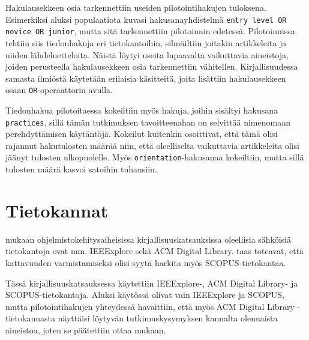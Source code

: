 \documentclass[utf8]{gradu3}
\begin{document}
Hakulausekkeen osia tarkennettiin useiden pilotointihakujen tuloksena. Esimerkiksi aluksi populaatiota kuvasi hakusanayhdistelmä {\tt entry level OR novice OR junior}, mutta sitä tarkennettiin pilotoinnin edetessä. Pilotoinnissa tehtiin siis tiedonhakuja eri tietokantoihin, silmäiltiin joitakin artikkeleita ja niiden lähdeluetteloita. Näistä löytyi useita lupaavalta vaikuttavia aineistoja, joiden perusteella hakulausekkeen osia tarkennettiin vähitellen. Kirjallisuudessa samasta ilmiöstä käytetään erilaisia käsitteitä, joita lisättiin hakulausekkeen osaan {\tt OR}-operaattorin avulla.

Tiedonhakua pilotoitaessa kokeiltiin myös hakuja, joihin sisältyi hakusana {\tt practices}, sillä tämän tutkimuksen tavoitteenahan on selvittää nimenomaan perehdyttämisen käytäntöjä. Kokeilut kuitenkin osoittivat, että tämä olisi rajannut hakutulosten määrää niin, että oleelliselta vaikuttavia artikkeleita olisi jäänyt tulosten ulkopuolelle. Myös {\tt orientation}-hakusanaa kokeiltiin, mutta sillä tulosten määrä kasvoi satoihin tuhansiin.  

\section{Tietokannat}

\textcite{brereton-ym-2007} mukaan ohjelmistokehitysaiheisissa kirjallisuuskatsauksissa oleellisia sähköisiä tietokantoja ovat mm. IEEExplore sekä ACM Digital Library. \textcite{kitchenham-charters-2007} taas toteavat, että kattavuuden varmistamiseksi olisi syytä harkita myös SCOPUS-tietokantaa.

Tässä kirjallisuuskatsauksessa käytettiin IEEExplore-, ACM Digital Library- ja SCOPUS-tietokantoja. Aluksi käytössä olivat vain IEEExplore ja SCOPUS, mutta pilotointihakujen yhteydessä havaittiin, että myös ACM Digital Library -tietokannasta näyttäisi löytyvän tutkimuskysymyksen kannalta olennaista aineistoa, joten se päätettiin ottaa mukaan.
\end{document}
